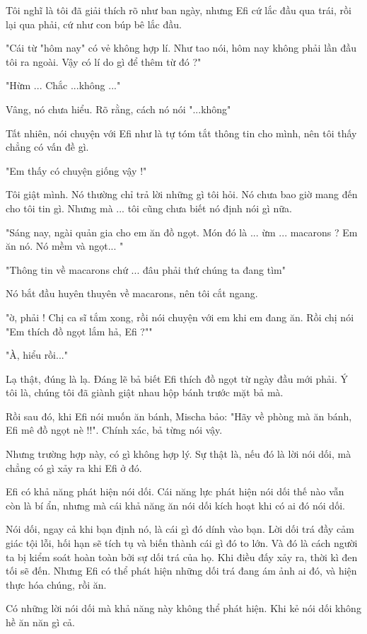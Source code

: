 Tôi nghĩ là tôi đã giải thích rõ như ban ngày, nhưng Efi cứ lắc đầu qua trái, rồi lại qua phải, cứ như con búp bê lắc đầu.

"Cái từ "hôm nay" có vẻ không hợp lí. Như tao nói, hôm nay không phải lần đầu tôi ra ngoài. Vậy có lí do gì để thêm từ đó ?"

"Hừm ... Chắc ...không ..."

Vâng, nó chưa hiểu. Rõ rằng, cách nó nói "...không"

Tất nhiên, nói chuyện với Efi như là tự tóm tắt thông tin cho mình, nên tôi thấy chẳng có vấn đề gì.

"Em thấy có chuyện giống vậy !"

Tôi giật mình. Nó thường chỉ trả lời những gì tôi hỏi. Nó chưa bao giờ mang đến cho tôi tin gì. Nhưng mà ... tôi cũng chưa biết nó định nói gì nữa.

"Sáng nay, ngài quản gia cho em ăn đồ ngọt. Món đó là ... ừm ... macarons ? Em ăn nó. Nó mềm và ngọt... "

"Thông tin về macarons chứ ... đâu phải thứ chúng ta đang tìm"

Nó bắt đầu huyên thuyên về macarons, nên tôi cắt ngang.

"ờ, phải ! Chị ca sĩ tắm xong, rồi nói chuyện với em khi em đang ăn. Rồi chị nói "Em thích đồ ngọt lắm hả, Efi ?""

"À, hiểu rồi..."

Lạ thật, đúng là lạ. Đáng lẽ bả biết Efi thích đồ ngọt từ ngày đầu mới phải. Ý tôi là, chúng tôi đã giành giật nhau hộp bánh trước mặt bả mà.
 
Rồi sau đó, khi Efi nói muốn ăn bánh, Mischa bảo: "Hãy về phòng mà ăn bánh, Efi mê đồ ngọt nè !!". Chính xác, bả từng nói vậy.

Nhưng trường hợp này, có gì không hợp lý. Sự thật là, nếu đó là lời nói dối, mà chẳng có gì xảy ra khi Efi ở đó.

Efi có khả năng phát hiện nói dối. Cái năng lực phát hiện nói dối thế nào vẫn còn là bí ẩn, nhưng mà cái khả năng ăn nói dối kích hoạt khi có ai đó nói dối.

Nói dối, ngay cả khi bạn định nó, là cái gì đó dính vào bạn. Lời dối trá đầy cảm giác tội lỗi, hối hạn sẽ tích tụ và biến thành cái gì đó to lớn. Và đó là cách người ta bị kiểm soát hoàn toàn bởi sự dối trá của họ. Khi điều đấy xảy ra, thời kì đen tối sẽ đến. Nhưng Efi có thể phát hiện những dối trá đang ám ảnh ai đó, và hiện thực hóa chúng, rồi ăn.

Có những lời nói dối mà khả năng này không thể phát hiện. Khi kẻ nói dối không hề ăn năn gì cả.

